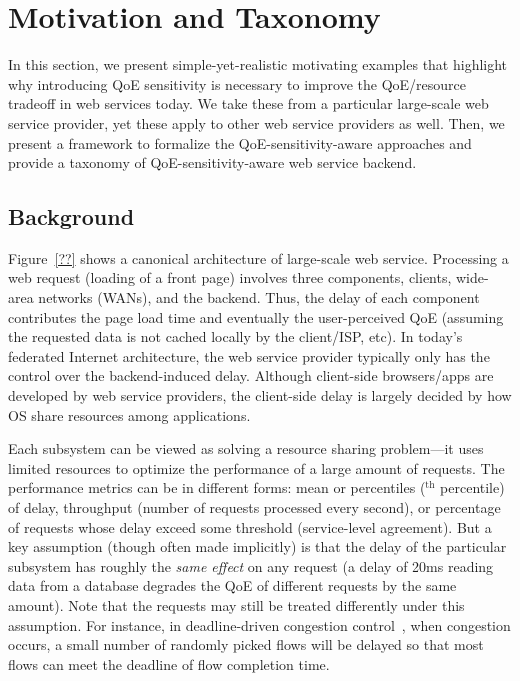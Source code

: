 
\section{Motivation and Taxonomy}

In this section, we present simple-yet-realistic motivating examples that highlight why introducing QoE sensitivity is necessary to improve the QoE/resource tradeoff in web services today. 
We take these from a particular large-scale web service provider, yet these apply to other web service providers as well.
Then, we present a framework to formalize the QoE-sensitivity-aware approaches and provide a taxonomy of QoE-sensitivity-aware web service backend.

\subsection{Background}
Figure~\ref{??} shows a canonical architecture of large-scale web service. 
Processing a web request (\eg loading of a front page) involves three components, clients, wide-area networks (WANs), and the backend. 
Thus, the delay of each component contributes the page load time and eventually the user-perceived QoE (assuming the requested data is not cached locally by the client/ISP, etc). 
In today's federated Internet architecture, the web service provider typically only has the control over the backend-induced delay. Although client-side browsers/apps are developed by web service providers, the client-side delay is largely decided by how OS share resources among applications. 


Each subsystem can be viewed as solving a resource sharing problem---it uses limited resources to optimize the performance of a large amount of requests. 
The performance metrics can be in different forms: mean or percentiles ($^\textrm{th}$ percentile) of delay, throughput (number of requests processed every second), or percentage of requests whose delay exceed some threshold (\eg service-level agreement).
But a key assumption (though often made implicitly) is that the delay of the particular subsystem has roughly the {\em same effect} on any request (\eg a delay of 20ms reading data from a database degrades the QoE of different requests by the same amount). 
Note that the requests may still be treated differently under this assumption. For instance, in deadline-driven congestion control~\cite{??}, when congestion occurs, a small number of randomly picked flows will be delayed so that most flows can meet the deadline of flow completion time. 


